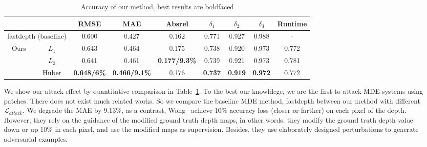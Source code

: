 \documentclass[10pt,twocolumn,letterpaper]{article}
\begin{document}
\begin{table}
    \centering  %
    \caption{Accuracy of our method, best results are boldfaced}  %
    \label{comparison table}  %
    \begin{tabular}{c|c|c|c|c|c|c|c|c}  
		\toprule
      \multicolumn{2}{c|}{}&RMSE &MAE
	  &Absrel &$\delta_1$ 
	  &$\delta_2$&$\delta_3$&Runtime \\  %
      \midrule
      \multicolumn{2}{c|}{fastdepth (baseline)}&0.600&0.427&0.162&0.771&0.927&0.988&- \\
      \hline  %
      \multirow{3}{*}{Ours}&$L_1$&0.643&0.464&0.175&0.738&0.920&0.973&0.772  \\
      					&$L_2$&0.641&0.461&\textbf{0.177/9.3\%}&0.739&0.921&0.973&0.781  \\
      	&Huber&\textbf{0.648/6\%}&\textbf{0.466/9.1\%}&0.176&\textbf{0.737}&\textbf{0.919}&\textbf{0.972}&0.772  \\
		\bottomrule
    \end{tabular}
  \end{table}
We show our attack effect by quantitative comparison in 
Table~\ref{comparison table}. To the best our knowldege,
we are the first to attack MDE systems using patches.
There does not exist much related works.
So we compare the baseline MDE method, fastdepth between
our method with different $\mathcal{L}_{attack}$.
We degrade the MAE by 9.13\%, as a contrast, 
Wong~\cite{Wong_2020_NIPS} achieve 10\% accuracy loss
(closer or farther)
on each pixel of the depth.
However, they rely on the guidance of the modified ground
truth depth maps, in other words, they modify the ground
truth depth value down or up 10\% in each pixel, 
and use the modified
maps as supervision. Besides, they use elaborately designed
perturbations to generate adversarial examples.

\end{document}
